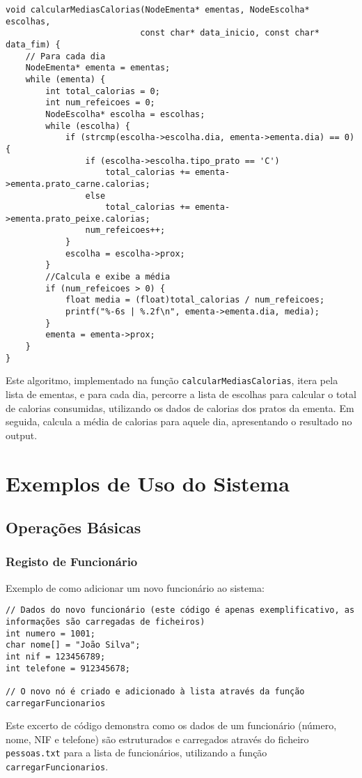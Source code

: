 \documentclass[a4paper,12pt]{report}
\begin{document}
\begin{lstlisting}[caption={Algoritmo de cálculo de estatísticas},label=lst:medias]
void calcularMediasCalorias(NodeEmenta* ementas, NodeEscolha* escolhas,
                           const char* data_inicio, const char* data_fim) {
    // Para cada dia
    NodeEmenta* ementa = ementas;
    while (ementa) {
        int total_calorias = 0;
        int num_refeicoes = 0;
        NodeEscolha* escolha = escolhas;
        while (escolha) {
            if (strcmp(escolha->escolha.dia, ementa->ementa.dia) == 0) {
                if (escolha->escolha.tipo_prato == 'C')
                    total_calorias += ementa->ementa.prato_carne.calorias;
                else
                    total_calorias += ementa->ementa.prato_peixe.calorias;
                num_refeicoes++;
            }
            escolha = escolha->prox;
        }
        //Calcula e exibe a média
        if (num_refeicoes > 0) {
            float media = (float)total_calorias / num_refeicoes;
            printf("%-6s | %.2f\n", ementa->ementa.dia, media);
        }
        ementa = ementa->prox;
    }
}
\end{lstlisting}
Este algoritmo, implementado na função \texttt{calcularMediasCalorias}, itera pela lista de ementas, e para cada dia, percorre a lista de escolhas para calcular o total de calorias consumidas, utilizando os dados de calorias dos pratos da ementa. Em seguida, calcula a média de calorias para aquele dia, apresentando o resultado no output.

\chapter{Exemplos de Uso do Sistema}

\section{Operações Básicas}

\subsection{Registo de Funcionário}
Exemplo de como adicionar um novo funcionário ao sistema:

\begin{lstlisting}[caption={Exemplo de registo de funcionário},label=lst:exemplo_registo_func]
// Dados do novo funcionário (este código é apenas exemplificativo, as informações são carregadas de ficheiros)
int numero = 1001;
char nome[] = "João Silva";
int nif = 123456789;
int telefone = 912345678;

// O novo nó é criado e adicionado à lista através da função carregarFuncionarios
\end{lstlisting}
Este excerto de código demonstra como os dados de um funcionário (número, nome, NIF e telefone) são estruturados e carregados através do ficheiro \texttt{pessoas.txt} para a lista de funcionários, utilizando a função \texttt{carregarFuncionarios}.
\end{document}
